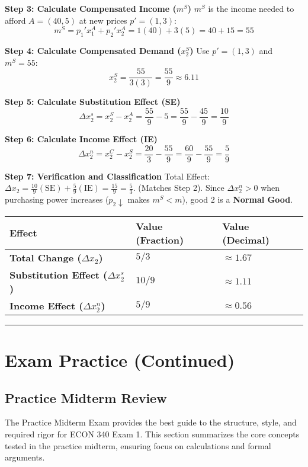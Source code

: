 \documentclass{article}
\begin{document}
\textbf{Step 3: Calculate Compensated Income ($m^S$)}
$m^S$ is the income needed to afford $A=(40, 5)$ at new prices $p'=(1, 3)$:
\[ m^S = p_1' x_1^A + p_2' x_2^A = 1(40) + 3(5) = 40 + 15 = 55 \]

\textbf{Step 4: Calculate Compensated Demand ($x_2^S$)}
Use $p'=(1, 3)$ and $m^S=55$:
\[ x_2^S = \frac{55}{3(3)} = \frac{55}{9} \approx 6.11 \]

\textbf{Step 5: Calculate Substitution Effect (SE)}
\[\Delta x_2^s = x_2^S - x_2^A = \frac{55}{9} - 5 = \frac{55}{9} - \frac{45}{9} = \frac{10}{9}\]

\textbf{Step 6: Calculate Income Effect (IE)}
\[\Delta x_2^n = x_2^C - x_2^S = \frac{20}{3} - \frac{55}{9} = \frac{60}{9} - \frac{55}{9} = \frac{5}{9}\]

\textbf{Step 7: Verification and Classification}
Total Effect: $\Delta x_2 = \frac{10}{9} (\text{SE}) + \frac{5}{9} (\text{IE}) = \frac{15}{9} = \frac{5}{3}$. (Matches Step 2).
Since $\Delta x_2^n > 0$ when purchasing power increases ($p_2 \downarrow$ makes $m^S < m$), good 2 is a \textbf{Normal Good}.

\begin{center}
\begin{tabular}{lll}
\toprule
Effect & Value (Fraction) & Value (Decimal) \\
\midrule
\textbf{Total Change ($\Delta x_2$)} & $5/3$ & $\approx 1.67$ \\
\textbf{Substitution Effect ($\Delta x_2^s$)} & $10/9$ & $\approx 1.11$ \\
\textbf{Income Effect ($\Delta x_2^n$)} & $5/9$ & $\approx 0.56$ \\
\bottomrule
\end{tabular}
\end{center}

\bigskip\noindent\rule{\linewidth}{0.4pt}

\section{Exam Practice (Continued)}
\subsection{Practice Midterm Review}

The Practice Midterm Exam provides the best guide to the structure, style, and required rigor for ECON 340 Exam 1. This section summarizes the core concepts tested in the practice midterm, ensuring focus on calculations and formal arguments.
\end{document}
